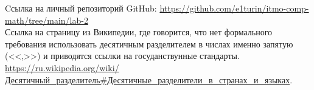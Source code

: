 \begin{thebibliography}{}
 Cсылка на личный репозиторий GitHub: \url{https://github.com/e1turin/itmo-comp-math/tree/main/lab-2}\\
 Ссылка на страницу из Википедии, где говорится, что нет формального требования использовать десятичным разделителем в числах именно запятую (<<,>>) и приводятся ссылки на госуданствунные стандарты. \url{https://ru.wikipedia.org/wiki/Десятичный_разделитель#Десятичные_разделители_в_странах_и_языках}.
\end{thebibliography}